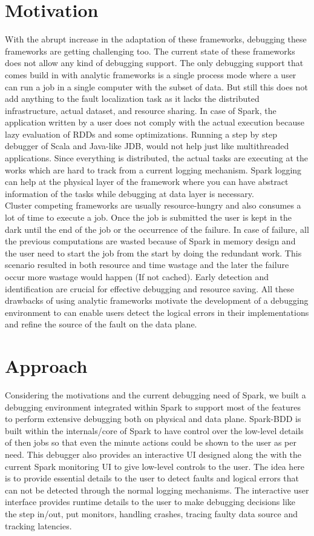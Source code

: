 \documentclass{acm_proc_article-sp}
\begin{document}
\section{Motivation}
With the abrupt increase in the adaptation of these frameworks, debugging these frameworks are getting challenging too. The current state of these frameworks does not allow any kind of debugging support. The only debugging support that comes build in with analytic frameworks is a single process mode where a user can run a job in a single computer with the subset of data. But still this does not add anything to the fault localization task as it lacks the distributed infrastructure, actual dataset, and resource sharing. In case of Spark, the application written by a user does not comply with the actual execution because lazy evaluation of RDDs and some optimizations. Running a step by step debugger of Scala and Java-like JDB, would not help just like multithreaded applications. Since everything is distributed, the actual tasks are executing at the works which are hard to track from a current logging mechanism. Spark logging can help at the physical layer of the framework where you can have abstract information of the tasks while debugging at data layer is necessary.\\
Cluster competing frameworks are usually resource-hungry and also consumes a lot of time to execute a job. Once the job is submitted the user  is kept in the dark until the end of the job or the occurrence of the failure. In case of failure, all the previous computations are wasted because of Spark in memory design and the user need to start the job from the start by doing the redundant work. This scenario resulted in both resource and time wastage and the later the failure occur more wastage would happen (If not cached).  Early detection and identification are crucial for effective debugging and resource saving. All these drawbacks of using analytic frameworks motivate the development of a debugging environment to can enable users detect the logical errors in their implementations and refine the source of the fault on the data plane.


\section{Approach}
Considering the motivations and the current debugging need of Spark, we built a debugging environment integrated within Spark to support most of the features to perform extensive debugging both on physical and data plane. Spark-BDD is built within the internals/core of Spark to have control over the low-level details of then jobs so that even the minute actions could be shown to the user as per need. This debugger also provides an interactive UI designed along the with the current Spark monitoring UI to give low-level controls to the user.  The idea here is to provide essential details to the user to detect faults and logical errors that can not be detected through the normal logging mechanisms. The interactive user interface provides runtime details to the user to make debugging decisions like the step in/out, put monitors, handling crashes, tracing faulty data source and tracking latencies.
\end{document}
